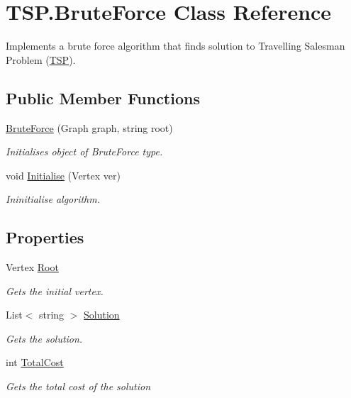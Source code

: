 \hypertarget{class_t_s_p_1_1_brute_force}{}\section{T\+S\+P.\+Brute\+Force Class Reference}
\label{class_t_s_p_1_1_brute_force}


Implements a brute force algorithm that finds solution to Travelling Salesman Problem (\hyperlink{namespace_t_s_p}{T\+SP}).  


\subsection*{Public Member Functions}
\begin{DoxyCompactItemize}
\item 
\hyperlink{class_t_s_p_1_1_brute_force_a48f806b378163a3ac35a9896cbd79b55}{Brute\+Force} (Graph graph, string root)
\begin{DoxyCompactList}\small\item\em Initialises object of {\itshape Brute\+Force}  type. \end{DoxyCompactList}\item 
void \hyperlink{class_t_s_p_1_1_brute_force_a80b9e44311d861a66005ef546b82fd9a}{Initialise} (Vertex ver)
\begin{DoxyCompactList}\small\item\em Ininitialise algorithm. \end{DoxyCompactList}\end{DoxyCompactItemize}
\subsection*{Properties}
\begin{DoxyCompactItemize}
\item 
Vertex \hyperlink{class_t_s_p_1_1_brute_force_acff5ab4beabff92192f8c782fecb3240}{Root}
\begin{DoxyCompactList}\small\item\em Gets the initial vertex. \end{DoxyCompactList}\item 
List$<$ string $>$ \hyperlink{class_t_s_p_1_1_brute_force_a1110ef3515d0412f462c18d4bece07e6}{Solution}
\begin{DoxyCompactList}\small\item\em Gets the solution. \end{DoxyCompactList}\item 
int \hyperlink{class_t_s_p_1_1_brute_force_a82ef137f4c0ab7386b45a2e56a8ea5cf}{Total\+Cost}
\begin{DoxyCompactList}\small\item\em Gets the total cost of the solution \end{DoxyCompactList}\end{DoxyCompactItemize}


